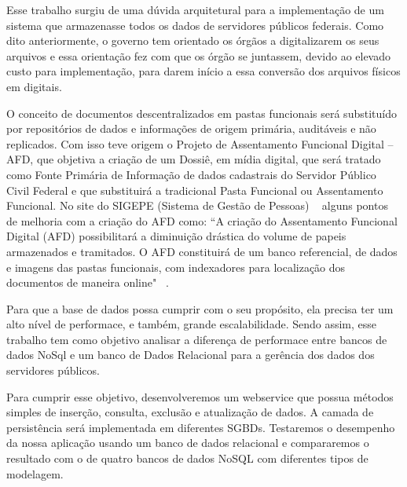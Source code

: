Esse trabalho surgiu de uma dúvida arquitetural para a implementação de um sistema que armazenasse todos os dados de servidores públicos federais. Como dito anteriormente, o governo tem orientado os órgãos a digitalizarem os seus arquivos e essa orientação fez com que os órgão se juntassem, devido ao elevado custo para implementação, para darem início a essa conversão dos arquivos físicos em digitais.

O conceito de documentos descentralizados em pastas funcionais será substituído por repositórios de dados e informações de origem primária, auditáveis e não replicados. Com isso teve origem o Projeto de Assentamento Funcional Digital – AFD, que objetiva a criação de um Dossiê, em mídia digital, que será tratado como Fonte Primária de Informação de dados cadastrais do Servidor Público Civil Federal e que substituirá a tradicional Pasta Funcional ou Assentamento Funcional. No site do SIGEPE (Sistema de Gestão de Pessoas) ~\cite{siteSIGEPE} alguns pontos de melhoria com a criação do AFD como: “A criação do Assentamento Funcional Digital (AFD) possibilitará a diminuição drástica do volume de papeis armazenados e tramitados. O AFD constituirá de um banco referencial, de dados e imagens das pastas funcionais, com indexadores para localização dos documentos de maneira online" ~\cite{apresentAFD}.

Para que a base de dados possa cumprir com o seu propósito, ela precisa ter um alto nível de performace, e também, grande escalabilidade. Sendo assim, esse trabalho tem como objetivo analisar a diferença de performace entre bancos de dados NoSql e um banco de Dados Relacional para a gerência dos dados dos servidores públicos.

Para cumprir esse objetivo, desenvolveremos um webservice que possua métodos simples de inserção, consulta, exclusão e atualização de dados. A camada de persistência será implementada em diferentes SGBDs. Testaremos o desempenho da nossa aplicação usando um banco de dados relacional e compararemos o resultado com o de quatro bancos de dados NoSQL com diferentes tipos de modelagem.
